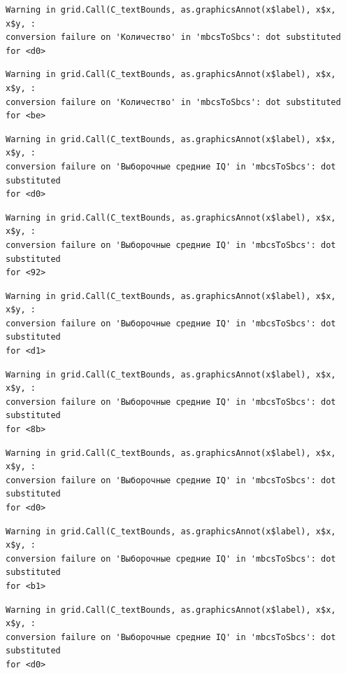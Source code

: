 \documentclass[
  letterpaper,
  DIV=11,
  numbers=noendperiod]{scrreprt}
\theoremstyle{definition}
\theoremstyle{remark}
\begin{document}
\begin{verbatim}
Warning in grid.Call(C_textBounds, as.graphicsAnnot(x$label), x$x, x$y, :
conversion failure on 'Количество' in 'mbcsToSbcs': dot substituted for <d0>
\end{verbatim}

\begin{verbatim}
Warning in grid.Call(C_textBounds, as.graphicsAnnot(x$label), x$x, x$y, :
conversion failure on 'Количество' in 'mbcsToSbcs': dot substituted for <be>
\end{verbatim}

\begin{verbatim}
Warning in grid.Call(C_textBounds, as.graphicsAnnot(x$label), x$x, x$y, :
conversion failure on 'Выборочные средние IQ' in 'mbcsToSbcs': dot substituted
for <d0>
\end{verbatim}

\begin{verbatim}
Warning in grid.Call(C_textBounds, as.graphicsAnnot(x$label), x$x, x$y, :
conversion failure on 'Выборочные средние IQ' in 'mbcsToSbcs': dot substituted
for <92>
\end{verbatim}

\begin{verbatim}
Warning in grid.Call(C_textBounds, as.graphicsAnnot(x$label), x$x, x$y, :
conversion failure on 'Выборочные средние IQ' in 'mbcsToSbcs': dot substituted
for <d1>
\end{verbatim}

\begin{verbatim}
Warning in grid.Call(C_textBounds, as.graphicsAnnot(x$label), x$x, x$y, :
conversion failure on 'Выборочные средние IQ' in 'mbcsToSbcs': dot substituted
for <8b>
\end{verbatim}

\begin{verbatim}
Warning in grid.Call(C_textBounds, as.graphicsAnnot(x$label), x$x, x$y, :
conversion failure on 'Выборочные средние IQ' in 'mbcsToSbcs': dot substituted
for <d0>
\end{verbatim}

\begin{verbatim}
Warning in grid.Call(C_textBounds, as.graphicsAnnot(x$label), x$x, x$y, :
conversion failure on 'Выборочные средние IQ' in 'mbcsToSbcs': dot substituted
for <b1>
\end{verbatim}

\begin{verbatim}
Warning in grid.Call(C_textBounds, as.graphicsAnnot(x$label), x$x, x$y, :
conversion failure on 'Выборочные средние IQ' in 'mbcsToSbcs': dot substituted
for <d0>
\end{verbatim}
\end{document}
